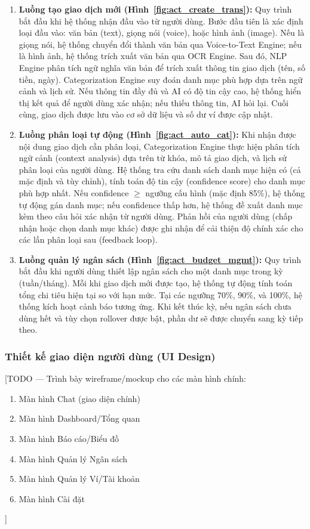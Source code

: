\begin{enumerate}
    \item \textbf{Luồng tạo giao dịch mới (Hình~\ref{fig:act_create_trans}):} Quy trình bắt đầu khi hệ thống nhận đầu vào từ người dùng. Bước đầu tiên là xác định loại đầu vào: văn bản (text), giọng nói (voice), hoặc hình ảnh (image). Nếu là giọng nói, hệ thống chuyển đổi thành văn bản qua Voice-to-Text Engine; nếu là hình ảnh, hệ thống trích xuất văn bản qua OCR Engine. Sau đó, NLP Engine phân tích ngữ nghĩa văn bản để trích xuất thông tin giao dịch (tên, số tiền, ngày). Categorization Engine suy đoán danh mục phù hợp dựa trên ngữ cảnh và lịch sử. Nếu thông tin đầy đủ và AI có độ tin cậy cao, hệ thống hiển thị kết quả để người dùng xác nhận; nếu thiếu thông tin, AI hỏi lại. Cuối cùng, giao dịch được lưu vào cơ sở dữ liệu và số dư ví được cập nhật.

    \item \textbf{Luồng phân loại tự động (Hình~\ref{fig:act_auto_cat}):} Khi nhận được nội dung giao dịch cần phân loại, Categorization Engine thực hiện phân tích ngữ cảnh (context analysis) dựa trên từ khóa, mô tả giao dịch, và lịch sử phân loại của người dùng. Hệ thống tra cứu danh sách danh mục hiện có (cả mặc định và tùy chỉnh), tính toán độ tin cậy (confidence score) cho danh mục phù hợp nhất. Nếu confidence $\ge$ ngưỡng cấu hình (mặc định 85\%), hệ thống tự động gán danh mục; nếu confidence thấp hơn, hệ thống đề xuất danh mục kèm theo câu hỏi xác nhận từ người dùng. Phản hồi của người dùng (chấp nhận hoặc chọn danh mục khác) được ghi nhận để cải thiện độ chính xác cho các lần phân loại sau (feedback loop).

    \item \textbf{Luồng quản lý ngân sách (Hình~\ref{fig:act_budget_mgmt}):} Quy trình bắt đầu khi người dùng thiết lập ngân sách cho một danh mục trong kỳ (tuần/tháng). Mỗi khi giao dịch mới được tạo, hệ thống tự động tính toán tổng chi tiêu hiện tại so với hạn mức. Tại các ngưỡng 70\%, 90\%, và 100\%, hệ thống kích hoạt cảnh báo tương ứng. Khi kết thúc kỳ, nếu ngân sách chưa dùng hết và tùy chọn rollover được bật, phần dư sẽ được chuyển sang kỳ tiếp theo.
\end{enumerate}

\subsubsection{Thiết kế giao diện người dùng (UI Design)}
[TODO --- Trình bày wireframe/mockup cho các màn hình chính:
\begin{enumerate}
    \item Màn hình Chat (giao diện chính)
    \item Màn hình Dashboard/Tổng quan
    \item Màn hình Báo cáo/Biểu đồ
    \item Màn hình Quản lý Ngân sách
    \item Màn hình Quản lý Ví/Tài khoản
    \item Màn hình Cài đặt
\end{enumerate}
]

